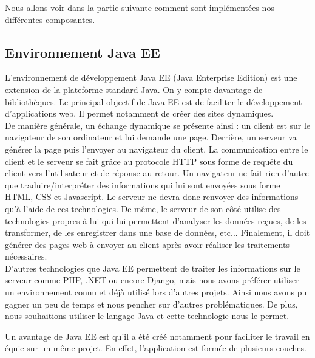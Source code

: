 Nous allons voir dans la partie suivante comment sont implémentées nos différentes composantes.

\subsection{Environnement Java EE}
L'environnement de développement Java EE (Java Enterprise Edition) est une extension de la plateforme standard Java. On y compte davantage de bibliothèques. Le principal objectif de Java EE est de faciliter le développement d'applications web. Il permet notamment de créer des sites dynamiques.\\

De manière générale, un échange dynamique se présente ainsi : un client est sur le navigateur de son ordinateur et lui demande une page. Derrière, un serveur va générer la page puis l'envoyer au navigateur du client.
La communication entre le client et le serveur se fait grâce au protocole HTTP sous forme de requête du client vers l'utilisateur et de réponse au retour.
Un navigateur ne fait rien d'autre que traduire/interpréter des informations qui lui sont envoyées sous forme HTML, CSS et Javascript. Le serveur ne devra donc renvoyer des informations qu'à l'aide de ces technologies.
De même, le serveur de son côté utilise des technologies propres à lui qui lui permettent d'analyser les données reçues, de les transformer, de les enregistrer dans une base de données, etc... Finalement, il doit générer des pages web à envoyer au client après avoir réaliser les traitements nécessaires.\\

D'autres technologies que Java EE permettent de traiter les informations sur le serveur comme PHP, .NET ou encore Django, mais nous avons préférer utiliser un environnement connu et déjà utilisé lors d'autres projets. Ainsi nous avons pu gagner un peu de temps et nous pencher sur d'autres problématiques. De plus, nous souhaitions utiliser le langage Java et cette technologie nous le permet.

Un avantage de Java EE est qu'il a été créé notamment pour faciliter le travail en équie sur un même projet. En effet, l'application est formée de plusieurs couches.\\

